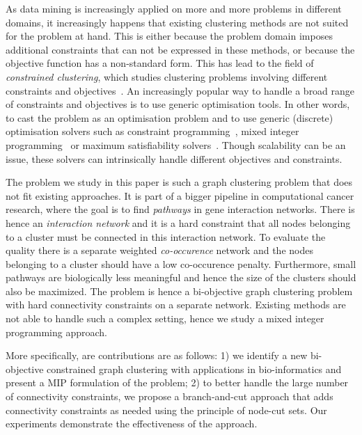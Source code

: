 \documentclass[conference]{IEEEtran}
\begin{document}
As data mining is increasingly applied on more and more problems in different domains, it increasingly happens that existing clustering methods are not suited for the problem at hand. This is either because the problem domain imposes additional constraints that can not be expressed in these methods, or because the objective function has a non-standard form. This has lead to the field of \textit{constrained clustering}, which studies clustering problems involving different constraints and objectives~\cite{basu2008constrained}. An increasingly popular way to handle a broad range of constraints and objectives is to use generic optimisation tools. In other words, to cast the problem as an optimisation problem and to use generic (discrete) optimisation solvers such as constraint programming~\cite{DaoDV13}, mixed integer programming~\cite{DBLP:conf/aaai/GilpinND13,DBLP:conf/cpaior/BabakiGN14} or maximum satisfiability solvers~\cite{DBLP:journals/ai/BergJ17}. Though scalability can be an issue, these solvers can intrinsically handle different objectives and constraints.

The problem we study in this paper is such a graph clustering problem that does not fit existing approaches. It is part of a bigger pipeline in computational cancer research, where the goal is to find \textit{pathways} in gene interaction networks. There is hence an \textit{interaction network} and it is a hard constraint that all nodes belonging to a cluster must be connected in this interaction network. To evaluate the quality there is a separate weighted \textit{co-occurence} network and the nodes belonging to a cluster should have a low co-occurence penalty. Furthermore, small pathways are biologically less meaningful and hence the size of the clusters should also be maximized. The problem is hence a bi-objective graph clustering problem with hard connectivity constraints on a separate network. Existing methods are not able to handle such a complex setting, hence we study a mixed integer programming approach.

More specifically, are contributions are as follows: 1) we identify a new bi-objective constrained graph clustering with applications in bio-informatics and present a MIP formulation of the problem; 2) to better handle the large number of connectivity constraints, we propose a branch-and-cut approach that adds connectivity constraints as needed using the principle of node-cut sets. Our experiments demonstrate the effectiveness of the approach.
\end{document}
